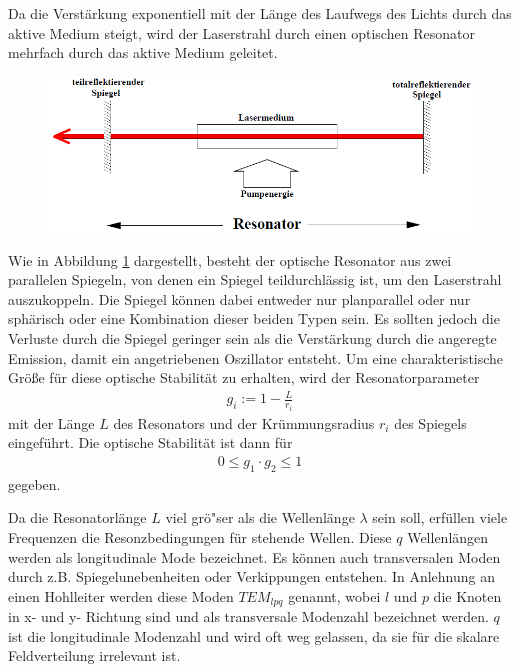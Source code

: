 \documentclass[]{scrartcl}
\begin{document}
Da die Verstärkung exponentiell mit der Länge des Laufwegs des Lichts durch das aktive Medium steigt, wird der Laserstrahl durch einen optischen Resonator mehrfach durch das aktive Medium geleitet.

\begin{figure}[h]
 \centering
 \includegraphics[width=12cm]{images/schema_resonator.png}
 \label{fig:schema_resonator}
\end{figure}

Wie in Abbildung \ref{fig:schema_resonator} dargestellt, besteht der optische Resonator aus zwei parallelen Spiegeln, von denen ein Spiegel teildurchlässig ist, um den Laserstrahl auszukoppeln.
Die Spiegel können dabei entweder nur planparallel oder nur sphärisch oder eine Kombination dieser beiden Typen sein.
Es sollten jedoch die Verluste durch die Spiegel geringer sein als die Verstärkung durch die angeregte Emission, damit ein angetriebenen Oszillator entsteht.
Um eine charakteristische Größe für diese optische Stabilität zu erhalten, wird der Resonatorparameter
\begin{align}
 g_i := 1- \frac{L}{r_i}
\end{align}
mit der Länge $L$ des Resonators und der Krümmungsradius $r_i$ des Spiegels eingeführt.
Die optische Stabilität ist dann für
\begin{align}
0 \le g_1 \cdot g_2 \le 1 
\label{eq:stabilitaet}
\end{align}
gegeben.

Da die Resonatorlänge $L$ viel grö"ser als die Wellenlänge $\lambda$ sein soll, erfüllen viele Frequenzen die Resonzbedingungen für stehende Wellen. 
Diese $q$ Wellenlängen werden als longitudinale Mode bezeichnet. Es können auch transversalen Moden durch z.B. Spiegelunebenheiten oder Verkippungen entstehen.
In Anlehnung an einen Hohlleiter werden diese Moden $TEM_{lpq}$ genannt, wobei $l$ und $p$ die Knoten in x- und y- Richtung sind und als transversale Modenzahl bezeichnet werden.
$q$ ist die longitudinale Modenzahl und wird oft weg gelassen, da sie für die skalare Feldverteilung irrelevant ist.  
\end{document}
